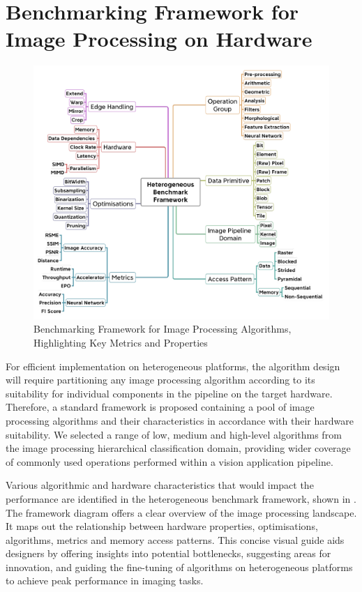 \section{Benchmarking Framework for Image Processing on Hardware}\label{sec:framework}
\begin{figure}[tb]
\centering
\includegraphics[width=\linewidth]{Images/Heterogeneous Benchmark Framework.png}
\caption[Benchmarking Framework]{Benchmarking Framework for Image Processing Algorithms, Highlighting Key Metrics and Properties}
\label{fig:AlgoChar}
\end{figure}
For efficient implementation on heterogeneous platforms, the algorithm design will require partitioning any image processing algorithm according to its suitability for individual components in the pipeline on the target hardware. Therefore, a standard framework is proposed containing a pool of image processing algorithms and their characteristics in accordance with their hardware suitability. We selected a range of low, medium and high-level algorithms from the image processing hierarchical classification domain, providing wider coverage of commonly used operations performed within a vision application pipeline. 

Various algorithmic and hardware characteristics that would impact the performance are identified in the heterogeneous benchmark framework, shown in . The framework diagram offers a clear overview of the image processing landscape. It maps out the relationship between hardware properties, optimisations, algorithms, metrics and memory access patterns. This concise visual guide aids designers by offering insights into potential bottlenecks, suggesting areas for innovation, and guiding the fine-tuning of algorithms on heterogeneous platforms to achieve peak performance in imaging tasks.


